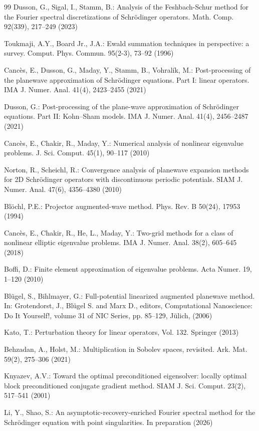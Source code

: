 \documentclass{sn-jnl}%
\numberwithin{equation}{section}
\theoremstyle{thmstyleone}%
\theoremstyle{thmstyletwo}%
\theoremstyle{thmstylethree}%
\begin{document}
\begin{thebibliography}{99}
Dusson, G., Sigal, I., Stamm, B.: Analysis of the Feshbach-Schur method for the Fourier spectral discretizations of Schrödinger operators.
Math. Comp. 92(339), 217--249 (2023)

Toukmaji, A.Y., Board Jr., J.A.: Ewald summation techniques in perspective: a survey.
Comput. Phys. Commun. 95(2-3), 73--92 (1996)

Cancès, E., Dusson, G., Maday, Y., Stamm, B., Vohralík, M.: Post-processing of the planewave approximation of Schrödinger equations. Part I: linear operators.
IMA J. Numer. Anal. 41(4), 2423--2455 (2021)

Dusson, G.: Post-processing of the plane-wave approximation of Schrödinger equations. Part II: Kohn--Sham models.
IMA J. Numer. Anal. 41(4), 2456--2487 (2021)

Cancès, E., Chakir, R., Maday, Y.: Numerical analysis of nonlinear eigenvalue problems.
J. Sci. Comput. 45(1), 90--117 (2010)

Norton, R., Scheichl, R.: Convergence analysis of planewave expansion methods for 2D Schrödinger operators with discontinuous periodic potentials.
SIAM J. Numer. Anal. 47(6), 4356--4380 (2010)

Blöchl, P.E.: Projector augmented-wave method.
Phys. Rev. B 50(24), 17953 (1994)

Cancès, E., Chakir, R., He, L., Maday, Y.: Two-grid methods for a class of nonlinear elliptic eigenvalue problems.
IMA J. Numer. Anal. 38(2), 605--645 (2018)

Boffi, D.: Finite element approximation of eigenvalue problems.
Acta Numer. 19, 1--120 (2010)

Bl\"ugel, S., Bihlmayer, G.: Full-potential linearized augmented planewave method.
In: Grotendorst, J., Bl\"ugel S. and Marx D., editors, Computational Nanoscience: Do It Yourself!,  
volume 31 of NIC Series, pp. 85--129, J\"ulich, (2006) 

Kato, T.: Perturbation theory for linear operators, Vol. 132.
Springer (2013)   %

Behzadan, A., Holst, M.: Multiplication in Sobolev spaces, revisited.
Ark. Mat. 59(2), 275--306 (2021)

Knyazev, A.V.: Toward the optimal preconditioned eigensolver: locally optimal block preconditioned conjugate gradient method.
SIAM J. Sci. Comput. 23(2), 517--541 (2001)

Li, Y., Shao, S.:  An asymptotic-recovery-enriched Fourier spectral method for the Schr\"odinger equation with point singularities. In preparation (2026)

\end{thebibliography}
\end{document}

